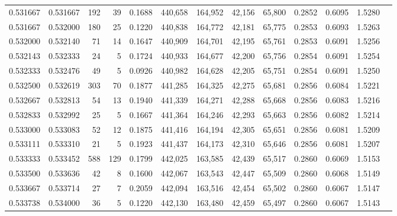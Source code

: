 \begin{tabular}{rrrrrrrrrrrrr}
0.531667 & 0.531667 &   192 &  39 &                                     0.1688 & 440,658 & 164,952 &  42,156 &  65,800 & 0.2852 & 0.6095 & 1.5280 \\
0.531667 & 0.532000 &   180 &  25 &                                     0.1220 & 440,838 & 164,772 &  42,181 &  65,775 & 0.2853 & 0.6093 & 1.5263 \\
0.532000 & 0.532140 &    71 &  14 &                                     0.1647 & 440,909 & 164,701 &  42,195 &  65,761 & 0.2853 & 0.6091 & 1.5256 \\
0.532143 & 0.532333 &    24 &   5 &                                     0.1724 & 440,933 & 164,677 &  42,200 &  65,756 & 0.2854 & 0.6091 & 1.5254 \\
0.532333 & 0.532476 &    49 &   5 &                                     0.0926 & 440,982 & 164,628 &  42,205 &  65,751 & 0.2854 & 0.6091 & 1.5250 \\
0.532500 & 0.532619 &   303 &  70 &                                     0.1877 & 441,285 & 164,325 &  42,275 &  65,681 & 0.2856 & 0.6084 & 1.5221 \\
0.532667 & 0.532813 &    54 &  13 &                                     0.1940 & 441,339 & 164,271 &  42,288 &  65,668 & 0.2856 & 0.6083 & 1.5216 \\
0.532833 & 0.532992 &    25 &   5 &                                     0.1667 & 441,364 & 164,246 &  42,293 &  65,663 & 0.2856 & 0.6082 & 1.5214 \\
0.533000 & 0.533083 &    52 &  12 &                                     0.1875 & 441,416 & 164,194 &  42,305 &  65,651 & 0.2856 & 0.6081 & 1.5209 \\
0.533111 & 0.533310 &    21 &   5 &                                     0.1923 & 441,437 & 164,173 &  42,310 &  65,646 & 0.2856 & 0.6081 & 1.5207 \\
0.533333 & 0.533452 &   588 & 129 &                                     0.1799 & 442,025 & 163,585 &  42,439 &  65,517 & 0.2860 & 0.6069 & 1.5153 \\
0.533500 & 0.533636 &    42 &   8 &                                     0.1600 & 442,067 & 163,543 &  42,447 &  65,509 & 0.2860 & 0.6068 & 1.5149 \\
0.533667 & 0.533714 &    27 &   7 &                                     0.2059 & 442,094 & 163,516 &  42,454 &  65,502 & 0.2860 & 0.6067 & 1.5147 \\
0.533738 & 0.534000 &    36 &   5 &                                     0.1220 & 442,130 & 163,480 &  42,459 &  65,497 & 0.2860 & 0.6067 & 1.5143 \\

\end{tabular}
